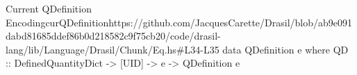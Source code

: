 \begin{haskell}{Current QDefinition Encoding}{curQDefinition}{https://github.com/JacquesCarette/Drasil/blob/ab9e091dabd81685ddef86b0d218582c9f75cb20/code/drasil-lang/lib/Language/Drasil/Chunk/Eq.hs\#L34-L35}
data QDefinition e where
  QD :: DefinedQuantityDict -> [UID] -> e -> QDefinition e
\end{haskell}
